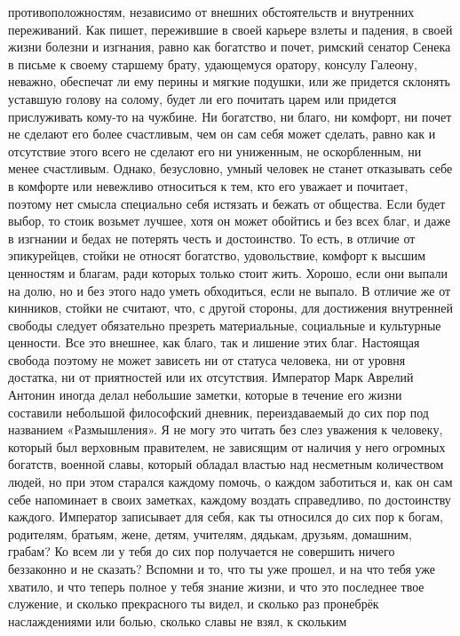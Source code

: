 противоположностям, независимо от внешних обстоятельств и внутренних
переживаний. Как пишет, пережившие в своей карьере взлеты и падения, в своей
жизни болезни и изгнания, равно как богатство и почет, римский сенатор Сенека в
письме к своему старшему брату, удающемуся оратору, консулу Галеону, неважно,
обеспечат ли ему перины и мягкие подушки, или же придется склонять уставшую
голову на солому, будет ли его почитать царем или придется прислуживать кому-то
на чужбине. Ни богатство, ни благо, ни комфорт, ни почет не сделают его более
счастливым, чем он сам себя может сделать, равно как и отсутствие этого всего не
сделают его ни униженным, не оскорбленным, ни менее счастливым. Однако,
безусловно, умный человек не станет отказывать себе в комфорте или невежливо
относиться к тем, кто его уважает и почитает, поэтому нет смысла специально себя
истязать и бежать от общества. Если будет выбор, то стоик возьмет лучшее, хотя
он может обойтись и без всех благ, и даже в изгнании и бедах не потерять честь и
достоинство. То есть, в отличие от эпикурейцев, стойки не относят богатство,
удовольствие, комфорт к высшим ценностям и благам, ради которых только стоит
жить. Хорошо, если они выпали на долю, но и без этого надо уметь обходиться,
если не выпало. В отличие же от кинников, стойки не считают, что, с другой
стороны, для достижения внутренней свободы следует обязательно презреть
материальные, социальные и культурные ценности. Все это внешнее, как благо, так
и лишение этих благ. Настоящая свобода поэтому не может зависеть ни от статуса
человека, ни от уровня достатка, ни от приятностей или их отсутствия. Император
Марк Аврелий Антонин иногда делал небольшие заметки, которые в течение его жизни
составили небольшой философский дневник, переиздаваемый до сих пор под названием
«Размышления». Я не могу это читать без слез уважения к человеку, который был
верховным правителем, не зависящим от наличия у него огромных богатств, военной
славы, который обладал властью над несметным количеством людей, но при этом
старался каждому помочь, о каждом заботиться и, как он сам себе напоминает в
своих заметках, каждому воздать справедливо, по достоинству каждого. Император
записывает для себя, как ты относился до сих пор к богам, родителям, братьям,
жене, детям, учителям, дядькам, друзьям, домашним, грабам? Ко всем ли у тебя до
сих пор получается не совершить ничего беззаконно и не сказать? Вспомни и то,
что ты уже прошел, и на что тебя уже хватило, и что теперь полное у тебя знание
жизни, и что это последнее твое служение, и сколько прекрасного ты видел, и
сколько раз пронебрёк наслаждениями или болью, сколько славы не взял, к скольким
